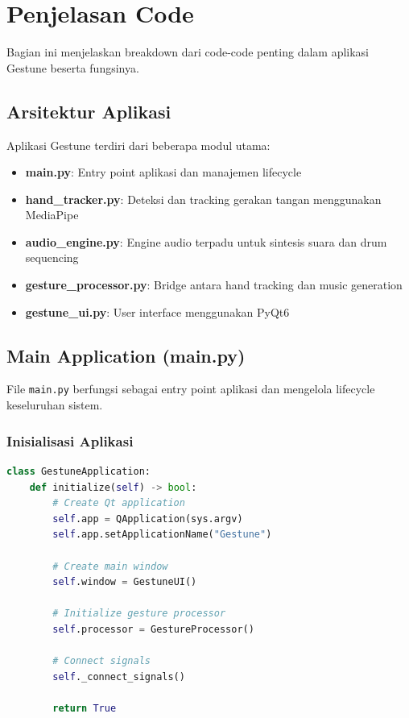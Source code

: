 \section{Penjelasan Code}

Bagian ini menjelaskan breakdown dari code-code penting dalam aplikasi Gestune beserta fungsinya.

\subsection{Arsitektur Aplikasi}

Aplikasi Gestune terdiri dari beberapa modul utama:

\begin{itemize}
    \item \textbf{main.py}: Entry point aplikasi dan manajemen lifecycle
    \item \textbf{hand\_tracker.py}: Deteksi dan tracking gerakan tangan menggunakan MediaPipe
    \item \textbf{audio\_engine.py}: Engine audio terpadu untuk sintesis suara dan drum sequencing
    \item \textbf{gesture\_processor.py}: Bridge antara hand tracking dan music generation
    \item \textbf{gestune\_ui.py}: User interface menggunakan PyQt6
\end{itemize}

\subsection{Main Application (main.py)}

File \texttt{main.py} berfungsi sebagai entry point aplikasi dan mengelola lifecycle keseluruhan sistem.

\subsubsection{Inisialisasi Aplikasi}

\begin{lstlisting}[language=Python, caption=Inisialisasi komponen utama]
class GestuneApplication:
    def initialize(self) -> bool:
        # Create Qt application
        self.app = QApplication(sys.argv)
        self.app.setApplicationName("Gestune")
        
        # Create main window
        self.window = GestuneUI()
        
        # Initialize gesture processor
        self.processor = GestureProcessor()
        
        # Connect signals
        self._connect_signals()
        
        return True
\end{lstlisting}

